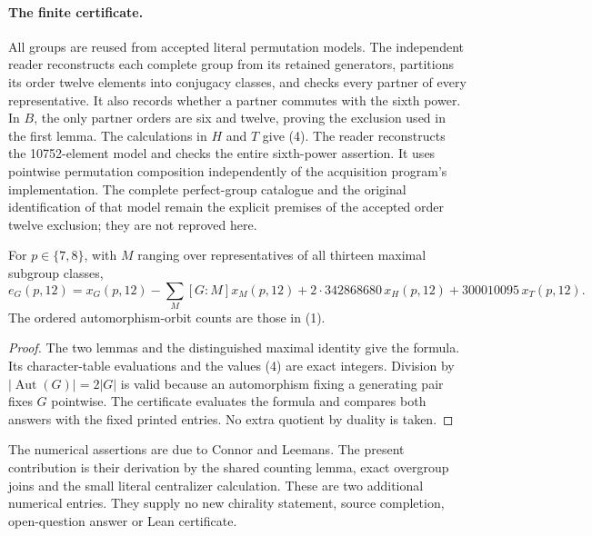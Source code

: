 \documentclass[11pt,a4paper]{article}
\begin{document}
\paragraph{The finite certificate.}
All groups are reused from accepted literal permutation models.
The independent reader reconstructs each complete group from its
retained generators, partitions its order twelve elements into
conjugacy classes, and checks every partner of every representative.
It also records whether a partner commutes with the sixth power.
In $B$, the only partner orders are six and twelve, proving the
exclusion used in the first lemma. The calculations in $H$ and $T$
give (4). The reader reconstructs the 10752-element model and checks
the entire sixth-power assertion. It uses pointwise permutation
composition independently of the acquisition program's implementation.
The complete perfect-group catalogue and the original identification
of that model remain the explicit premises of the accepted order
twelve exclusion; they are not reproved here.

\begin{theorem}
For $p\in\{7,8\}$, with $M$ ranging over representatives of all thirteen
maximal subgroup classes,
\[
 e_G(p,12)=x_G(p,12)-\sum_M[G:M]x_M(p,12)
       +2\cdot342868680\,x_H(p,12)+300010095\,x_T(p,12).
\]
The ordered automorphism-orbit counts are those in (1).
\end{theorem}
\begin{proof}
The two lemmas and the distinguished maximal identity give the formula.
Its character-table evaluations and the values (4) are exact integers.
Division by $|\operatorname{Aut}(G)|=2|G|$ is valid because an
automorphism fixing a generating pair fixes $G$ pointwise. The
certificate evaluates the formula and compares both answers with
the fixed printed entries. No extra quotient by duality is taken.
\end{proof}

The numerical assertions are due to Connor and Leemans. The present
contribution is their derivation by the shared counting lemma, exact
overgroup joins and the small literal centralizer calculation.
These are two additional numerical entries. They supply no new chirality
statement, source completion, open-question answer or Lean certificate.
\end{document}
